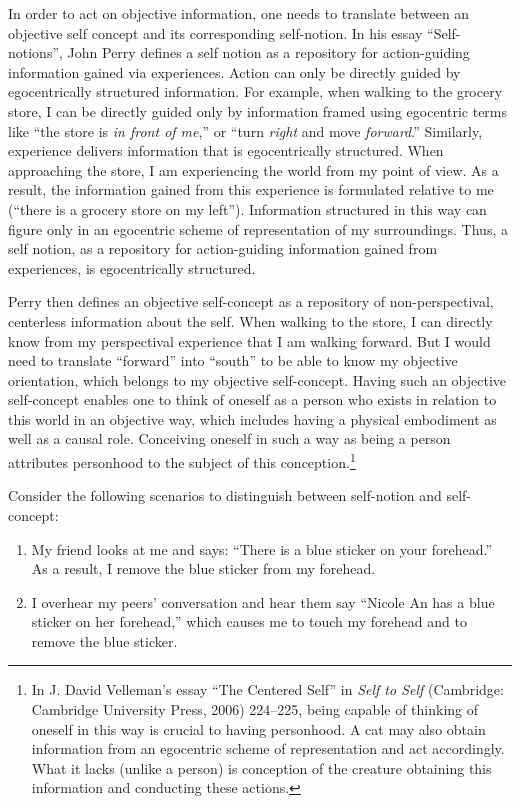 In order to act on objective information, one needs to translate between
an objective self concept and its corresponding self-notion. In his
essay ``Self-notions'', John Perry defines a self notion as a repository
for action-guiding information gained via experiences. Action can only
be directly guided by egocentrically structured information. For
example, when walking to the grocery store, I can be directly guided
only by information framed using egocentric terms like ``the store is
\emph{in front of me},'' or ``turn \emph{right} and move
\emph{forward}.'' Similarly, experience delivers information that is
egocentrically structured. When approaching the store, I am experiencing
the world from my point of view. As a result, the information gained
from this experience is formulated relative to me (``there is a grocery
store on my left''). Information structured in this way can figure only
in an egocentric scheme of representation of my surroundings. Thus, a
self notion, as a repository for action-guiding information gained from
experiences, is egocentrically structured.

Perry then defines an objective self-concept as a repository of
non-perspectival, centerless information about the self. When walking to
the store, I can directly know from my perspectival experience that I am
walking forward. But I would need to translate ``forward'' into
``south'' to be able to know my objective orientation, which belongs to
my objective self-concept. Having such an objective self-concept enables
one to think of oneself as a person who exists in relation to this world
in an objective way, which includes having a physical embodiment as well
as a causal role. Conceiving oneself in such a way as being a person
attributes personhood to the subject of this conception.\footnote{In J.
  David Velleman's essay ``The Centered Self'' in \emph{Self to Self}
  (Cambridge: Cambridge University Press, 2006) 224--225, being capable
  of thinking of oneself in this way is crucial to having personhood. A
  cat may also obtain information from an egocentric scheme of
  representation and act accordingly. What it lacks (unlike a person) is
  conception of the creature obtaining this information and conducting
  these actions.}

Consider the following scenarios to distinguish between self-notion and
self-concept:


\begin{enumerate}
\item
  My friend looks at me and says: ``There is a blue sticker on your
  forehead.'' As a result, I remove the blue sticker from my forehead.
\item
  I overhear my peers' conversation and hear them say ``Nicole An has a
  blue sticker on her forehead,'' which causes me to touch my forehead
  and to remove the blue sticker.
\end{enumerate}

